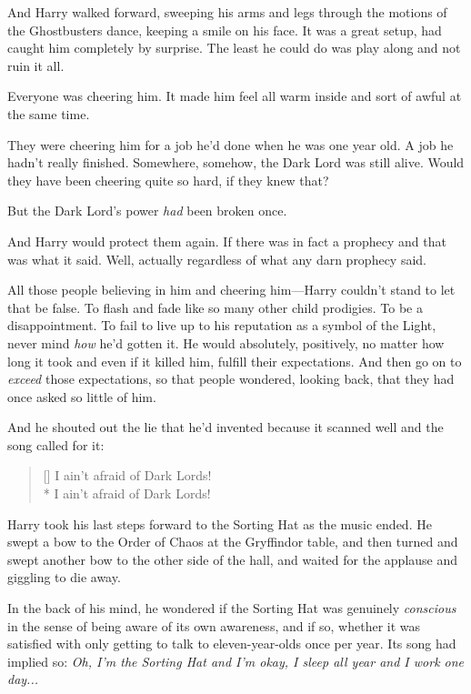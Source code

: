And Harry walked forward, sweeping his arms and legs through the motions of the Ghostbusters dance, keeping a smile on his face. It was a great setup, had caught him completely by surprise. The least he could do was play along and not ruin it all.

Everyone was cheering him. It made him feel all warm inside and sort of awful at the same time.

They were cheering him for a job he’d done when he was one year old. A job he hadn’t really finished. Somewhere, somehow, the Dark Lord was still alive. Would they have been cheering quite so hard, if they knew that?

But the Dark Lord’s power \emph{had} been broken once.

And Harry would protect them again. If there was in fact a prophecy and that was what it said. Well, actually regardless of what any darn prophecy said.

All those people believing in him and cheering him—Harry couldn’t stand to let that be false. To flash and fade like so many other child prodigies. To be a disappointment. To fail to live up to his reputation as a symbol of the Light, never mind \emph{how} he’d gotten it. He would absolutely, positively, no matter how long it took and even if it killed him, fulfill their expectations. And then go on to \emph{exceed} those expectations, so that people wondered, looking back, that they had once asked so little of him.

And he shouted out the lie that he’d invented because it scanned well and the song called for it:

\begin{verse}[\versewidth]
I ain’t afraid of Dark Lords!\\*
I ain’t afraid of Dark Lords!
\end{verse}

Harry took his last steps forward to the Sorting Hat as the music ended. He swept a bow to the Order of Chaos at the Gryffindor table, and then turned and swept another bow to the other side of the hall, and waited for the applause and giggling to die away.

In the back of his mind, he wondered if the Sorting Hat was genuinely \emph{conscious} in the sense of being aware of its own awareness, and if so, whether it was satisfied with only getting to talk to eleven-year-olds once per year. Its song had implied so: \emph{Oh, I’m the Sorting Hat and I’m okay, I sleep all year and I work one day...}


